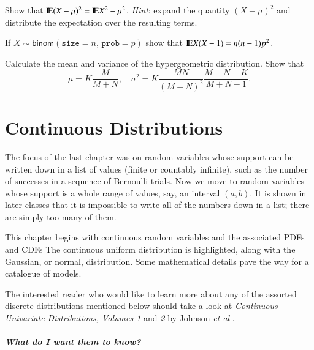 \documentclass[captions=tableheading]{scrbook}
\begin{document}
\begin{xca}
\label{xca:variance-shortcut}
Show that \(\mathrm{I\hspace{-1.5pt}E}(X-\mu)^{2}=\mathrm{I\hspace{-1.5pt}E} X^{2}-\mu^{2}\). \emph{Hint}: expand the quantity \((X-\mu)^{2}\) and distribute the expectation over the resulting terms.
\end{xca}

\begin{xca}
\label{xca:binom-factorial-expectation}
If \(X\sim\mathsf{binom}(\mathtt{size}=n,\,\mathtt{prob}=p)\) show that \(\mathrm{I\hspace{-1.5pt}E} X(X-1)=n(n-1)p^{2}\).
\end{xca}

\begin{xca}
\label{xca:hyper-mean-variance}
Calculate the mean and variance of the hypergeometric distribution. Show that 
\begin{equation}
\mu=K\frac{M}{M+N},\quad\sigma^{2}=K\frac{MN}{(M+N)^{2}}\frac{M+N-K}{M+N-1}.
\end{equation}
\end{xca}
\chapter{Continuous Distributions}
\label{sec-6}

\label{cha:Continuous-Distributions}

\noindent The focus of the last chapter was on random variables whose support can be written down in a list of values (finite or countably infinite), such as the number of successes in a sequence of Bernoulli trials. Now we move to random variables whose support is a whole range of values, say, an interval \((a,b)\). It is shown in later classes that it is impossible to write all of the numbers down in a list; there are simply too many of them.

This chapter begins with continuous random variables and the associated PDFs and CDFs The continuous uniform distribution is highlighted, along with the Gaussian, or normal, distribution. Some mathematical details pave the way for a catalogue of models.

The interested reader who would like to learn more about any of the assorted discrete distributions mentioned below should take a look at \emph{Continuous Univariate Distributions, Volumes 1} and \emph{2} by Johnson \emph{et al} \cite{Johnson1994,Johnson1995}.


\paragraph*{What do I want them to know?}
\end{document}
